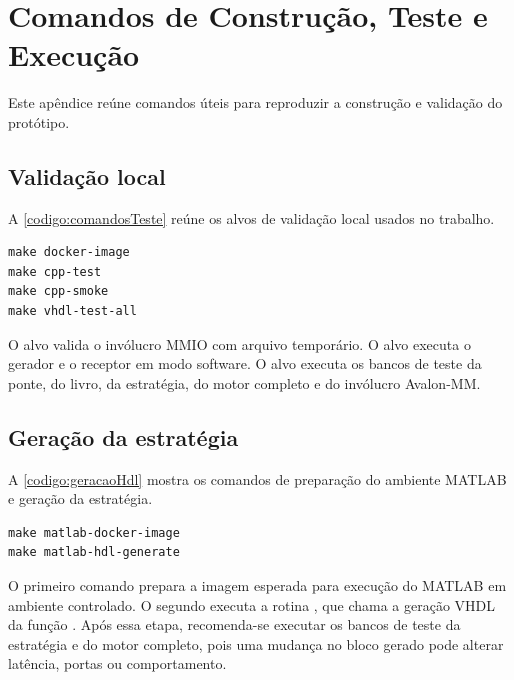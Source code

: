 
\chapter{Comandos de Construção, Teste e Execução}\label{cap:apendiceb}

Este apêndice reúne comandos úteis para reproduzir a construção e validação do protótipo.

\section{Validação local}\label{sec:apendiceValidacaoLocal}

A \autoref{codigo:comandosTeste} reúne os alvos de validação local usados no trabalho.

\begin{sourcecode}[htb]
\caption{\label{codigo:comandosTeste}Comandos de teste local}
\begin{lstlisting}[frame=single]
make docker-image
make cpp-test
make cpp-smoke
make vhdl-test-all
\end{lstlisting}
\end{sourcecode}

O alvo  valida o invólucro MMIO com arquivo temporário. O alvo  executa o gerador e o receptor em modo software. O alvo  executa os bancos de teste da ponte, do livro, da estratégia, do motor completo e do invólucro Avalon-MM.

\section{Geração da estratégia}\label{sec:apendiceGeracaoEstrategia}

A \autoref{codigo:geracaoHdl} mostra os comandos de preparação do ambiente MATLAB e geração da estratégia.

\begin{sourcecode}[htb]
\caption{\label{codigo:geracaoHdl}Geração do bloco de estratégia por HDL Coder}
\begin{lstlisting}[frame=single]
make matlab-docker-image
make matlab-hdl-generate
\end{lstlisting}
\end{sourcecode}

O primeiro comando prepara a imagem esperada para execução do MATLAB em ambiente controlado. O segundo executa a rotina , que chama a geração VHDL da função . Após essa etapa, recomenda-se executar os bancos de teste da estratégia e do motor completo, pois uma mudança no bloco gerado pode alterar latência, portas ou comportamento.

